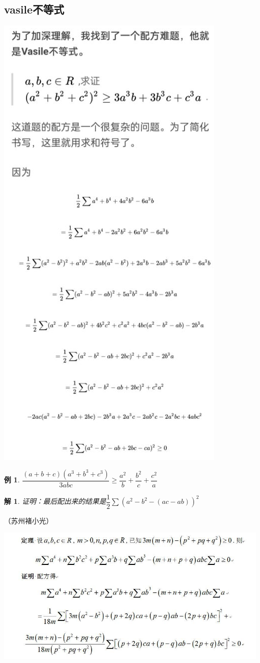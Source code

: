 \documentclass[UTF8]{ctexart}
\newtheorem{1}{例}
\newtheorem{2}{解}
\begin{document}
\subsection{vasile不等式}
\begin{center}
	\includegraphics[width=0.6\linewidth]{352}
\end{center}
\begin{1}
	$ \dfrac{(a+b+c)(a^{3}+b^{3}+c^{3})}{3 a b c}\ge \dfrac{a^{2}}{b}+\dfrac{b^{2}}{c}+\dfrac{c^{2}}{a}  $
\end{1}
\begin{2}
	证明：最后配出来的结果是$ \dfrac{1}{2}\sum (a^{2}-b^{2}-(ac-ab))^{2} $
\end{2}
（苏州\quad 褚小光）
\begin{center}
	\includegraphics[width=0.8\linewidth]{b01}
\end{center}
\end{document}
